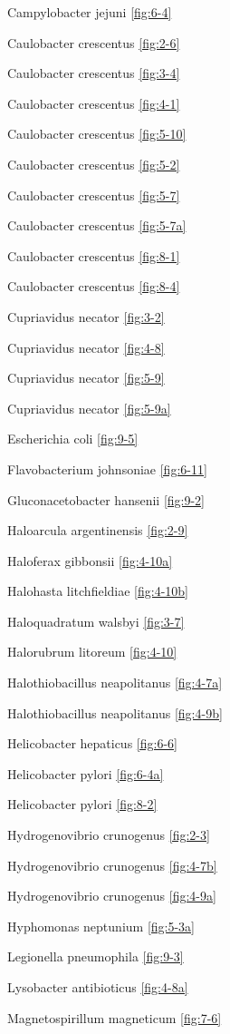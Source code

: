 \documentclass[]{tufte-book}
\begin{document}
Campylobacter jejuni \ref{fig:6-4}

Caulobacter crescentus \ref{fig:2-6}

Caulobacter crescentus \ref{fig:3-4}

Caulobacter crescentus \ref{fig:4-1}

Caulobacter crescentus \ref{fig:5-10}

Caulobacter crescentus \ref{fig:5-2}

Caulobacter crescentus \ref{fig:5-7}

Caulobacter crescentus \ref{fig:5-7a}

Caulobacter crescentus \ref{fig:8-1}

Caulobacter crescentus \ref{fig:8-4}

Cupriavidus necator \ref{fig:3-2}

Cupriavidus necator \ref{fig:4-8}

Cupriavidus necator \ref{fig:5-9}

Cupriavidus necator \ref{fig:5-9a}

Escherichia coli \ref{fig:9-5}

Flavobacterium johnsoniae \ref{fig:6-11}

Gluconacetobacter hansenii \ref{fig:9-2}

Haloarcula argentinensis \ref{fig:2-9}

Haloferax gibbonsii \ref{fig:4-10a}

Halohasta litchfieldiae \ref{fig:4-10b}

Haloquadratum walsbyi \ref{fig:3-7}

Halorubrum litoreum \ref{fig:4-10}

Halothiobacillus neapolitanus \ref{fig:4-7a}

Halothiobacillus neapolitanus \ref{fig:4-9b}

Helicobacter hepaticus \ref{fig:6-6}

Helicobacter pylori \ref{fig:6-4a}

Helicobacter pylori \ref{fig:8-2}

Hydrogenovibrio crunogenus \ref{fig:2-3}

Hydrogenovibrio crunogenus \ref{fig:4-7b}

Hydrogenovibrio crunogenus \ref{fig:4-9a}

Hyphomonas neptunium \ref{fig:5-3a}

Legionella pneumophila \ref{fig:9-3}

Lysobacter antibioticus \ref{fig:4-8a}

Magnetospirillum magneticum \ref{fig:7-6}
\end{document}
